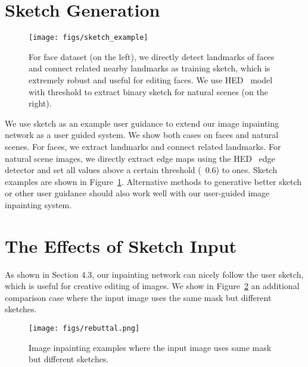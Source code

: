 \documentclass[10pt,twocolumn,letterpaper]{article}
\begin{document}
\section{Sketch Generation} \label{secs:sketch}
\begin{figure}[ht]
  \centering
  \texttt{[image: figs/sketch\_example]}
  \caption{For face dataset (on the left), we directly detect landmarks of faces and connect related nearby landmarks as training sketch, which is extremely robust and useful for editing faces. We use HED~\cite{xie2015holistically} model with threshold  to extract binary sketch for natural scenes (on the right).}
  \label{figs:sketch}
\end{figure}
We use sketch as an example user guidance to extend our image inpainting network as a user guided system. We show both cases on faces and natural scenes. For faces, we extract landmarks and connect related landmarks. For natural scene images, we directly extract edge maps using the HED~\cite{xie2015holistically} edge detector and set all values above a certain threshold (\ie~0.6) to ones. Sketch examples are shown in Figure~\ref{figs:sketch}. Alternative methods to generative better sketch or other user guidance should also work well with our user-guided image inpainting system.


\section{The Effects of Sketch Input}
\label{secs:sketch_effect}
As shown in Section 4.3, our inpainting network can nicely follow the user sketch, which is useful for creative editing of images. We show in Figure~\ref{figs:rebuttal} an additional comparison case where the input image uses the same mask but different sketches.

\begin{figure}
\centering
\vspace{-3mm}
\texttt{[image: figs/rebuttal.png]}
\caption{Image inpainting examples where the input image uses same mask but different sketches.}
\label{figs:rebuttal}
\vspace{-3mm}
\end{figure}
\end{document}

